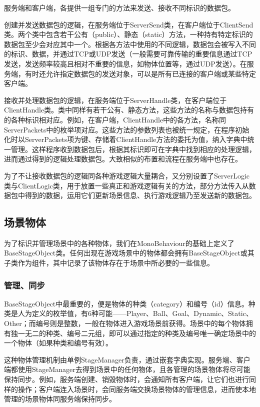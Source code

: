 \documentclass[conference]{IEEEtran}
\begin{document}
服务端和客户端，各提供一组专门的方法来发送、接收不同标识的数据包。

创建并发送数据包的逻辑，在服务端位于ServerSend类，在客户端位于ClientSend类。两个类中包含若干公有（public）、静态（static）方法，一种持有特定标识的数据包至少会对应其中一个。根据各方法中使用的不同逻辑，数据包会被写入不同的标识、数据，并通过TCP或UDP发送（一般需要可靠传输的重要信息通过TCP发送，发送频率较高且相对不重要的信息，如物体位置等，通过UDP发送）。在服务端，有时还允许指定数据包的发送对象，可以是所有已连接的客户端或某些特定客户端。

接收并处理数据包的逻辑，在服务端位于ServerHandle类，在客户端位于ClientHandle类。类中同样有若干公有、静态方法，这些方法的名称与数据包持有的各种标识相对应。例如，在客户端，ClientHandle中的各方法，名称同ServerPackets中的枚举项对应。这些方法的参数列表也被统一规定，在程序初始化时以ServerPackets项为键、存储着ClientHandle方法的委托为值，纳入字典中统一管理。这样程序收到数据包后，根据其标识即可在字典中找到相应的处理逻辑，进而通过得到的逻辑处理数据包。大致相似的布置和流程在服务端中也存在。

为了不让接收数据包的逻辑同各种游戏逻辑大量耦合，又分别设置了ServerLogic类与ClientLogic类，用于放置一些真正和游戏逻辑有关的方法，部分方法传入从数据包中得到的数据，运用它们更新场景信息、执行游戏逻辑乃至发送新的数据包。

\subsection{场景物体}
为了标识并管理场景中的各种物体，我们在MonoBehaviour的基础上定义了BaseStageObject类。任何出现在游戏场景中的物体都会拥有BaseStageObject或其子类作为组件，其中记录了该物体存在于场景中所必要的一些信息。
\subsubsection{管理、同步}
\quad

BaseStageObject中最重要的，便是物体的种类（category）和编号（id）信息。种类是人为定义的枚举值，有6种可能——Player、Ball、Goal、Dynamic、Static、Other；而编号则是整数，一般在物体进入游戏场景前获得。场景中的每个物体拥有独一无二的种类、编号二元组，即可以通过指定的种类及编号唯一确定场景中的一个物体（如果种类和编号有效）。

这种物体管理机制由单例StageManager负责，通过嵌套字典实现。服务端、客户端都使用StageManager去得到场景中的任何物体，且各管理的场景物体将尽可能保持同步。例如，服务端创建、销毁物体时，会通知所有客户端，让它们也进行同样的操作；客户端连入场景时，会同服务端交换场景物体的管理信息，进而使本地管理的场景物体同服务端保持同步。
\end{document}
